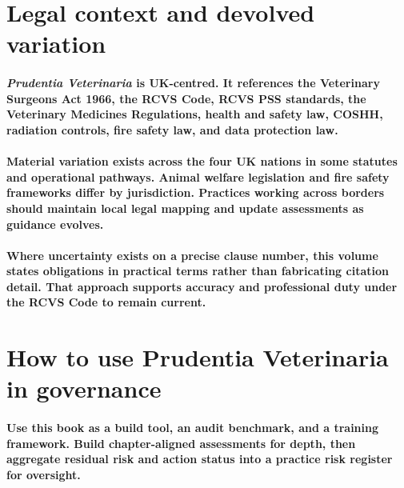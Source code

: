 
\section{Legal context and devolved variation}

\paragraph{\textit{Prudentia Veterinaria} is UK-centred. It references the Veterinary Surgeons Act 1966, the RCVS Code, RCVS PSS standards, the Veterinary Medicines Regulations, health and safety law, COSHH, radiation controls, fire safety law, and data protection law.}

\paragraph{Material variation exists across the four UK nations in some statutes and operational pathways. Animal welfare legislation and fire safety frameworks differ by jurisdiction. Practices working across borders should maintain local legal mapping and update assessments as guidance evolves.}

\paragraph{Where uncertainty exists on a precise clause number, this volume states obligations in practical terms rather than fabricating citation detail. That approach supports accuracy and professional duty under the RCVS Code to remain current.}

\section{How to use Prudentia Veterinaria in governance}

\paragraph{Use this book as a build tool, an audit benchmark, and a training framework. Build chapter-aligned assessments for depth, then aggregate residual risk and action status into a practice risk register for oversight.}

